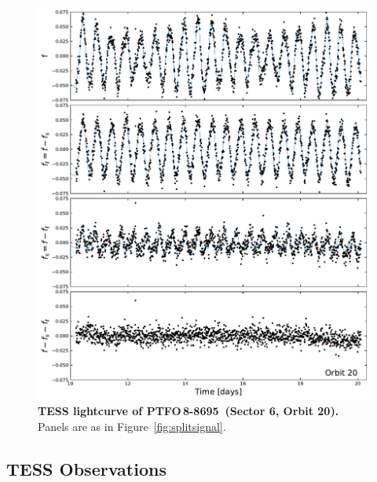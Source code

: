 \documentclass[12pt,twocolumn,tighten]{aastex62}
\newcommand{\ptfo}{PTFO$\,$8-8695}
\begin{document}
\begin{figure}[hbtp]
	\begin{center}
		\leavevmode
		\includegraphics[width=1\textwidth]{f2.pdf}
	\end{center}
	\vspace{-0.7cm}
  \caption{ {\bf TESS lightcurve of \ptfo\ (Sector 6, Orbit 20).}
		Panels are as in Figure~\ref{fig:splitsignal}.
		\label{fig:splitsignalii}
	}
\end{figure}



\subsection{TESS Observations}
\end{document}
